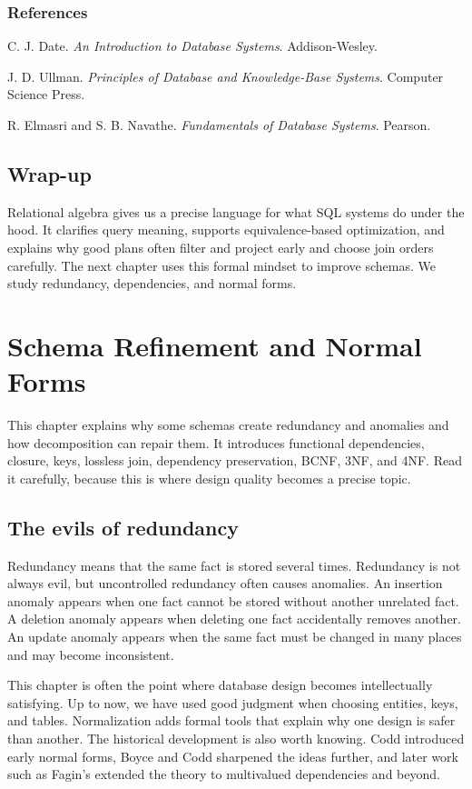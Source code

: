 \documentclass[11pt,a4paper,openany]{book}
\makeatletter
\renewenvironment{thebibliography}[1]
 {\subsection*{References}%
  \list{\@biblabel{\@arabic\c@enumiv}}%
   {\settowidth\labelwidth{\@biblabel{#1}}%
    \leftmargin\labelwidth\advance\leftmargin\labelsep
    \usecounter{enumiv}\let\p@enumiv\@empty
    \renewcommand\theenumiv{\@arabic\c@enumiv}}%
  \sloppy\clubpenalty4000\widowpenalty4000}
 {\endlist}
\makeatother
\begin{document}
\begin{thebibliography}{9}
C. J. Date.
\textit{An Introduction to Database Systems}. Addison-Wesley.

J. D. Ullman.
\textit{Principles of Database and Knowledge-Base Systems}. Computer Science Press.

R. Elmasri and S. B. Navathe.
\textit{Fundamentals of Database Systems}. Pearson.
\end{thebibliography}

\section{Wrap-up}
Relational algebra gives us a precise language for what SQL systems do under the hood. It clarifies query meaning, supports equivalence-based optimization, and explains why good plans often filter and project early and choose join orders carefully. The next chapter uses this formal mindset to improve schemas. We study redundancy, dependencies, and normal forms.
\chapter{Schema Refinement and Normal Forms}
\label{ch:nf}
\begin{guidancebox}
This chapter explains why some schemas create redundancy and anomalies and how decomposition can repair them. It introduces functional dependencies, closure, keys, lossless join, dependency preservation, BCNF, 3NF, and 4NF. Read it carefully, because this is where design quality becomes a precise topic.
\end{guidancebox}

\section{The evils of redundancy}
Redundancy means that the same fact is stored several times. Redundancy is not always evil, but uncontrolled redundancy often causes anomalies. An insertion anomaly appears when one fact cannot be stored without another unrelated fact. A deletion anomaly appears when deleting one fact accidentally removes another. An update anomaly appears when the same fact must be changed in many places and may become inconsistent.

This chapter is often the point where database design becomes intellectually satisfying. Up to now, we have used good judgment when choosing entities, keys, and tables. Normalization adds formal tools that explain why one design is safer than another. The historical development is also worth knowing. Codd introduced early normal forms, Boyce and Codd sharpened the ideas further, and later work such as Fagin's extended the theory to multivalued dependencies and beyond.
\end{document}
